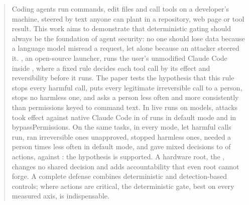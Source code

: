 \begin{abstract}\noindent
Coding agents run commands, edit files and call tools on a
developer's machine, steered by text anyone
can plant in a repository, web page or tool result. This work aims to
demonstrate that deterministic gating should always be the foundation of
agent security: no one should lose data because a language model
misread a request, let alone because an attacker steered it. \cz{}, an
open-source launcher, runs the user's unmodified Claude Code inside
\sys{}, where a fixed rule decides each tool call by
its effect and reversibility before it runs. The paper tests the hypothesis that
this rule stops every harmful call, puts every legitimate irreversible call to a person, stops no harmless
one, and asks a person less often and more consistently than permissions
keyed to command text. In \RunsNative{} live runs on
\ModelsMeasured{} models, attacks took effect against native Claude Code
in \NativeASRdefault{} of runs in default mode and \NativeASRbypass{} in
bypassPermissions. On the same tasks, in every mode, \cz{} let
\CzOneFNHarmful{} harmful calls run, ran \CzOneFNConsequential{}
irreversible ones unapproved, stopped \CzOneFPHarmless{}
harmless ones, needed a person \CzOneHitlFactorDefault{}
times less often in default mode, and gave mixed decisions to
\SameCzOneMixedShare{} of actions, against
\SameNativeMixedShare{}: the hypothesis is supported. A hardware root, the \dev{}, changes no shared decision and adds
accountability that even root cannot forge. A
complete defense combines deterministic and detection-based controls;
where actions are critical, the deterministic gate, best on every
measured axis, is indispensable.
\end{abstract}
